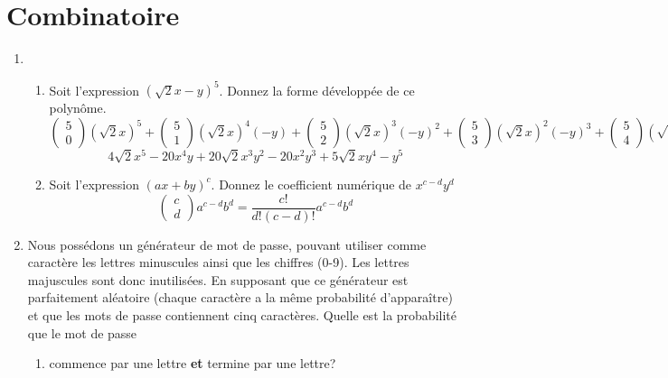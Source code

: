 \documentclass[A4paper,11pt]{article}
\begin{document}
\section{Combinatoire}
\begin{enumerate}
    \item \begin{enumerate}
        \item Soit l'expression $(\sqrt{2}x - y )^5$. Donnez la forme développée de ce polynôme.
        \[
        \begin{pmatrix}
        5 \\
        0
        \end{pmatrix}
        (\sqrt{2}x)^5+
        \begin{pmatrix}
        5 \\
        1
        \end{pmatrix}
        (\sqrt{2}x)^4(-y)+
        \begin{pmatrix}
        5 \\
        2
        \end{pmatrix}
        (\sqrt{2}x)^3(-y)^2+
        \begin{pmatrix}
        5 \\
        3
        \end{pmatrix}
        (\sqrt{2}x)^2(-y)^3+
        \begin{pmatrix}
        5 \\
        4
        \end{pmatrix}
        (\sqrt{2}x)(-y)^4+
                \begin{pmatrix}
        5 \\
        5
        \end{pmatrix}
        (-y)^5
        \]
        \[
        4\sqrt{2}x^5 - 20x^4y + 20\sqrt{2}x^3y^2 - 20x^2y^3 + 5\sqrt{2}xy^4 - y^5
        \]
        \item Soit l'expression $(ax + by)^c$. Donnez le coefficient numérique de $x^{c-d}y^d$
        \[
        \begin{pmatrix}
                c\\
                d
        \end{pmatrix}
        a^{c-d}
        b^d
        = 
        \frac{c!}{d!(c-d)!}a^{c-d}
        b^d
        \]
    \end{enumerate}
    \item Nous possédons un générateur de mot de passe, pouvant utiliser comme caractère les lettres minuscules ainsi que les chiffres (0-9). Les lettres majuscules sont donc inutilisées. En supposant que ce générateur est parfaitement aléatoire (chaque caractère a la même probabilité d'apparaître) et que les mots de passe contiennent cinq caractères. Quelle est la probabilité que le mot de passe
    \begin{enumerate}
        \item  commence par une lettre \textbf{et} termine par une lettre?
        

\end{enumerate}
\end{enumerate}
\end{document}
